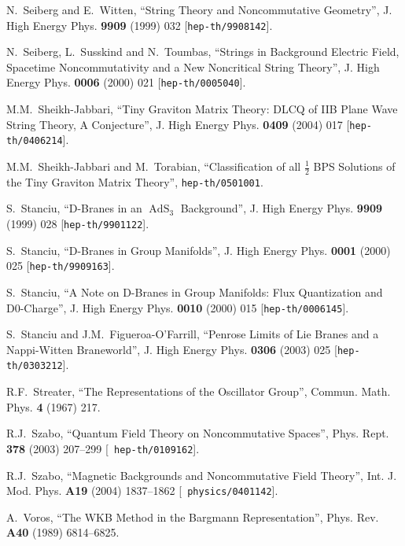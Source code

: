 \documentclass[11pt,a4paper]{article}
\DeclareMathOperator{\AdS}{AdS}
\begin{document}
\begin{thebibliography}{99}
 N.~Seiberg and E.~Witten, ``String Theory and
  Noncommutative Geometry'', J. High Energy Phys. {\bf 9909} (1999)
  032 [{\tt hep-th/9908142}].

 N.~Seiberg, L.~Susskind and N.~Toumbas, ``Strings in
  Background Electric Field, Spacetime Noncommutativity and a New
  Noncritical String Theory'', J. High Energy Phys. {\bf 0006} (2000)
  021 [{\tt hep-th/0005040}].

 M.M.~Sheikh-Jabbari, ``Tiny Graviton Matrix Theory:
  DLCQ of IIB Plane Wave String Theory, A Conjecture'', J. High Energy
  Phys. {\bf 0409} (2004) 017 [{\tt hep-th/0406214}].

 M.M.~Sheikh-Jabbari and M.~Torabian, ``Classification
  of all $\frac12$ BPS Solutions of the Tiny Graviton Matrix Theory'',
  {\tt hep-th/0501001}.

 S.~Stanciu, ``D-Branes in an $\AdS_3$ Background'',
  J. High Energy Phys. {\bf 9909} (1999) 028 [{\tt hep-th/9901122}].

 S.~Stanciu, ``D-Branes in Group Manifolds'',
  J. High Energy Phys. {\bf 0001} (2000) 025 [{\tt hep-th/9909163}].

 S.~Stanciu, ``A Note on D-Branes in Group
  Manifolds: Flux Quantization and D0-Charge'', J. High Energy
  Phys. {\bf 0010} (2000) 015 [{\tt hep-th/0006145}].

 S.~Stanciu and J.M.~Figueroa-O'Farrill, ``Penrose Limits
  of Lie Branes and a Nappi-Witten Braneworld'', J. High Energy
  Phys. {\bf 0306} (2003) 025 [{\tt hep-th/0303212}].

 R.F.~Streater, ``The Representations of the
  Oscillator Group'', Commun. Math. Phys. {\bf 4} (1967) 217.

 R.J.~Szabo, ``Quantum Field Theory on Noncommutative
  Spaces'', Phys. Rept. {\bf 378} (2003) 207--299 [{\tt
    hep-th/0109162}].

 R.J.~Szabo, ``Magnetic Backgrounds and Noncommutative
  Field Theory'', Int. J. Mod. Phys. {\bf A19} (2004) 1837--1862 [{\tt
    physics/0401142}].

 A.~Voros, ``The WKB Method in the Bargmann
  Representation'', Phys. Rev. {\bf A40} (1989) 6814--6825.

\end{thebibliography}
\end{document}
